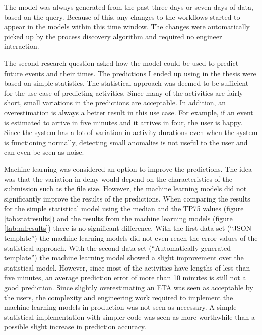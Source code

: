 The model was always generated from the past three days or seven days of data, based on the query. Because of this, any changes to the workflows started to appear in the models within this time window. 
The changes were automatically picked up by the process discovery algorithm and required no engineer interaction.

The second research question asked how the model could be used to predict future events and their times. 
The predictions I ended up using in the thesis were based on simple statistics. 
The statistical approach was deemed to be sufficient for the use case of predicting activities. 
Since many of the activities are fairly short, small variations in the predictions are acceptable. 
In addition, an overestimation is always a better result in this use case.
For example, if an event is estimated to arrive in five minutes and it arrives in four, the user is happy.
Since the system has a lot of variation in activity durations even when the system is functioning normally, detecting small anomalies is not useful to the user and can even be seen as noise.

Machine learning was considered an option to improve the predictions. The idea was that the variation in delay would depend on the characteristics of the submission such as the file size.
However, the machine learning models did not significantly improve the results of the predictions.
When comparing the results for the simple statistical model using the median and the TP75 values (figure \ref{tab:statresults}) and the results from the machine learning models (figure \ref{tab:mlresults}) there is no significant difference.
With the first data set (``JSON template'') the machine learning models did not even reach the error values of the statistical approach.
With the second data set (``Automatically generated template'') the machine learning model showed a slight improvement over the statistical model.
However, since most of the activities have lengths of less than five minutes, an average prediction error of more than 10 minutes is still not a good prediction.
Since slightly overestimating an ETA was seen as acceptable by the users, the complexity and engineering work required to implement the machine learning models in production was not seen as necessary.
A simple statistical implementation with simpler code was seen as more worthwhile than a possible slight increase in prediction accuracy.

